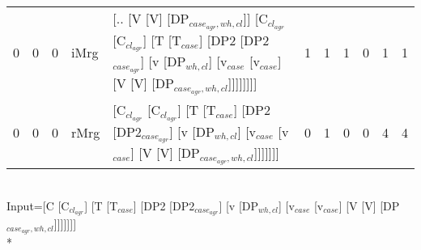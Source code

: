 \begin{tabularx}{\linewidth}{rrrlXrrrrrr}
   0 &       0 &   0 & iMrg  & [.. [V [V] [DP$_{case_{agr},wh,cl}$]] [C$_{cl_{agr}}$ [C$_{cl_{agr}}$] [T [T$_{case}$] [DP2 [DP2$_{case_{agr}}$] [v [DP$_{wh,cl}$] [v$_{case}$ [v$_{case}$] [V [V] [DP$_{case_{agr},wh,cl}$]]]]]]]]                                                                    &             1 &             1 &                  1 &            0 &        1 &        1 \\
   0 &       0 &   0 & rMrg  & [C$_{cl_{agr}}$ [C$_{cl_{agr}}$] [T [T$_{case}$] [DP2 [DP2$_{case_{agr}}$] [v [DP$_{wh,cl}$] [v$_{case}$ [v$_{case}$] [V [V] [DP$_{case_{agr},wh,cl}$]]]]]]]                                                                                                     &             0 &             1 &                  0 &            0 &        4 &        4 \\
\hline
\end{tabularx}\endgroup\\
\begingroup\scriptsize Input=[C [C$_{cl_{agr}}$] [T [T$_{case}$] [DP2 [DP2$_{case_{agr}}$] [v [DP$_{wh,cl}$] [v$_{case}$ [v$_{case}$] [V [V] [DP$_{case_{agr},wh,cl}$]]]]]]]\\*
